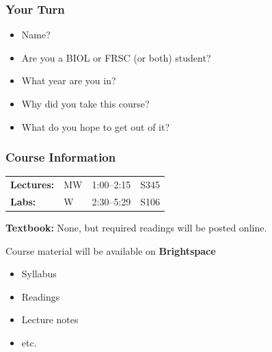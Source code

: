 \documentclass[10pt]{beamer}
\begin{document}
\begin{frame}[t]
\frametitle{Your Turn}
\vspace{0.5cm}
	
	\begin{itemize}
		\item Name?
		\medskip
		\item Are you a BIOL or FRSC (or both) student?
		\medskip
		\item What year are you in?
		\medskip
		\item Why did you take this course?
		\medskip
		\item What do you hope to get out of it?
	\end{itemize}
\end{frame}


\begin{frame}[t]
\frametitle{Course Information}
\vspace{0.5cm}

	\begin{tabular}{@{} l l l l}
		\textbf{Lectures:} & MW & 1:00--2:15 & S345\\
		\addlinespace
		\textbf{Labs:} & W & 2:30--5:29 & S106\\
	\end{tabular}

	\vspace{1.0cm}

	\textbf{Textbook:} None, but required readings will be posted online.
	
	\vspace{1.0cm}
	
	Course material will be available on \textbf{Brightspace}
		\begin{itemize}
			\item Syllabus
			\item Readings
			\item Lecture notes
			\item etc.
		\end{itemize}
\end{frame}
\end{document}
